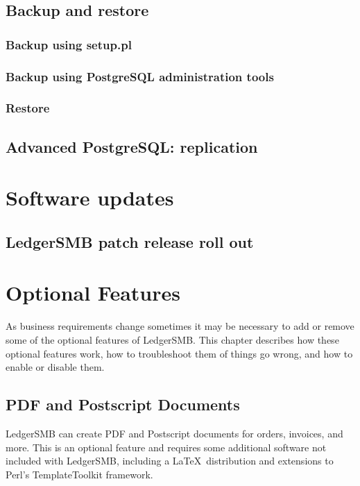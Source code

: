 \section{Backup and restore}

\subsection{Backup using setup.pl}

\subsection{Backup using PostgreSQL administration tools}

\subsection{Restore}

\section{Advanced PostgreSQL: replication}

\chapter{Software updates}

\section{LedgerSMB patch release roll out}

\chapter{Optional Features}

As business requirements change sometimes it may be necessary to add or remove
some of the optional features of LedgerSMB.  This chapter describes how these
optional features work, how to troubleshoot them of things go wrong, and how to
enable or disable them.

\section{PDF and Postscript Documents}

LedgerSMB can create PDF and Postscript documents for orders, invoices, and
more.  This is an optional feature and requires some additional software not
included with LedgerSMB, including a \LaTeX\ distribution and extensions to 
Perl's TemplateToolkit framework.

